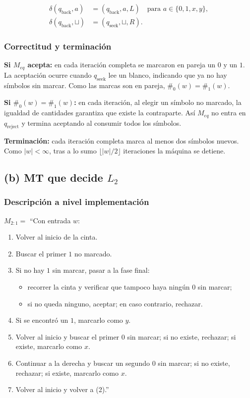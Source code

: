\documentclass[11pt,a4paper]{article}
\theoremstyle{plain}
\theoremstyle{definition}
\theoremstyle{remark}
\newcommand{\qreject}{q_{\text{reject}}}
\newcommand{\qseek}{q_{\text{seek}}}
\newcommand{\qback}{q_{\text{back}}}
\newcommand{\countz}{\#_{0}}
\newcommand{\countu}{\#_{1}}
\newcommand{\blank}{\sqcup}
\begin{document}
\begin{align*}
\delta(\qback,a) &= (\qback,a,L) \quad \text{para } a\in\{0,1,x,y\},\\
\delta(\qback,\blank) &= (\qseek,\blank,R).
\end{align*}

\subsubsection*{Correctitud y terminaci\'on}

\textbf{Si $M_{eq}$ acepta:} en cada iteraci\'on completa se marcaron en
pareja un $0$ y un $1$. La aceptaci\'on ocurre cuando $\qseek$ lee un
blanco, indicando que ya no hay s\'imbolos sin marcar. Como las marcas son
en pareja, $\countz(w)=\countu(w)$.

\textbf{Si $\countz(w)=\countu(w)$:} en cada iteraci\'on, al elegir un
s\'imbolo no marcado, la igualdad de cantidades garantiza que existe la
contraparte. As\'i $M_{eq}$ no entra en $\qreject$ y termina aceptando al
consumir todos los s\'imbolos.

\textbf{Terminaci\'on:} cada iteraci\'on completa marca al menos dos
s\'imbolos nuevos. Como $|w|<\infty$, tras a lo sumo $\lfloor |w|/2\rfloor$
iteraciones la m\'aquina se detiene.

\subsection*{(b) MT que decide $L_2$}

\subsubsection*{Descripci\'on a nivel implementaci\'on}

\(M_{2{:}1}=\) ``Con entrada $w$:
\begin{enumerate}
  \item Volver al inicio de la cinta.
  \item Buscar el primer $1$ no marcado.
  \item Si no hay $1$ sin marcar, pasar a la fase final:
        \begin{itemize}
          \item recorrer la cinta y verificar que tampoco haya ning\'un $0$
                sin marcar;
          \item si no queda ninguno, aceptar; en caso contrario, rechazar.
        \end{itemize}
  \item Si se encontr\'o un $1$, marcarlo como $y$.
  \item Volver al inicio y buscar el primer $0$ sin marcar; si no existe,
        rechazar; si existe, marcarlo como $x$.
  \item Continuar a la derecha y buscar un segundo $0$ sin marcar; si no
        existe, rechazar; si existe, marcarlo como $x$.
  \item Volver al inicio y volver a (2).''
\end{enumerate}
\end{document}
